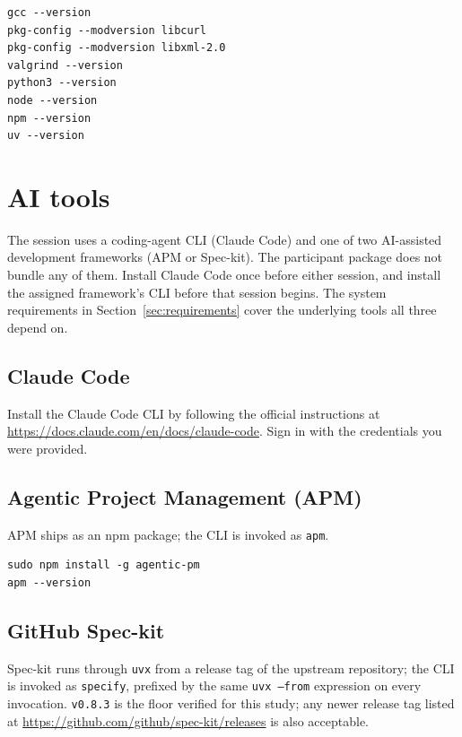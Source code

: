 \documentclass[11pt, a4paper]{article}
\begin{document}
\begin{verbatim}
gcc --version
pkg-config --modversion libcurl
pkg-config --modversion libxml-2.0
valgrind --version
python3 --version
node --version
npm --version
uv --version
\end{verbatim}

\section{AI tools}
\label{sec:aitools}

The session uses a coding-agent CLI (Claude Code) and one of two AI-assisted development frameworks (APM or Spec-kit). The participant package does not bundle any of them. Install Claude Code once before either session, and install the assigned framework's CLI before that session begins. The system requirements in Section~\ref{sec:requirements} cover the underlying tools all three depend on.

\subsection{Claude Code}
\label{sec:aitools:claude}

Install the Claude Code CLI by following the official instructions at \url{https://docs.claude.com/en/docs/claude-code}. Sign in with the credentials you were provided.

\subsection{Agentic Project Management (APM)}
\label{sec:aitools:apm}

APM ships as an npm package; the CLI is invoked as \texttt{apm}.

\begin{verbatim}
sudo npm install -g agentic-pm
apm --version
\end{verbatim}

\subsection{GitHub Spec-kit}
\label{sec:aitools:speckit}

Spec-kit runs through \texttt{uvx} from a release tag of the upstream repository; the CLI is invoked as \texttt{specify}, prefixed by the same \texttt{uvx --from} expression on every invocation. \texttt{v0.8.3} is the floor verified for this study; any newer release tag listed at \url{https://github.com/github/spec-kit/releases} is also acceptable.
\end{document}
